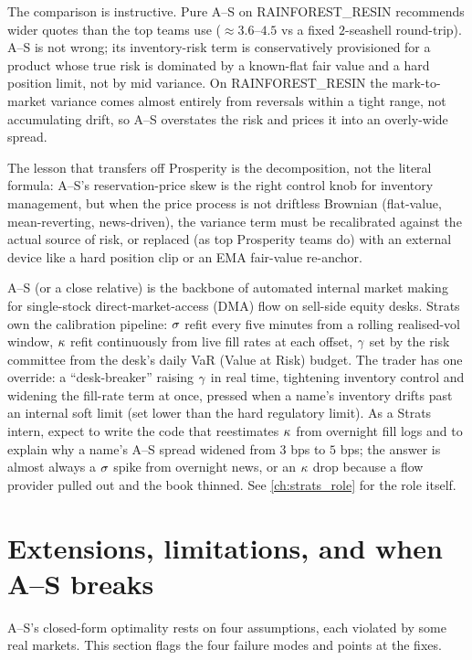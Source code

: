 The comparison is instructive. Pure A--S on RAINFOREST\_RESIN
recommends wider quotes than the top teams use
($\approx 3.6$--$4.5$ vs a fixed $2$-seashell round-trip). A--S is
not wrong; its inventory-risk term is conservatively provisioned for
a product whose true risk is dominated by a known-flat fair value
and a hard position limit, not by mid variance. On RAINFOREST\_RESIN
the mark-to-market variance comes almost entirely from reversals
within a tight range, not accumulating drift, so A--S overstates
the risk and prices it into an overly-wide spread.

The lesson that transfers off Prosperity is the decomposition, not
the literal formula: A--S's reservation-price skew is the right
control knob for inventory management, but when the price process
is not driftless Brownian (flat-value, mean-reverting, news-driven),
the variance term must be recalibrated against the actual source of
risk, or replaced (as top Prosperity teams do) with an external
device like a hard position clip or an EMA fair-value re-anchor.

\begin{gsbox}
A--S (or a close relative) is the backbone of automated internal
market making for single-stock direct-market-access (DMA) flow on
sell-side equity desks. Strats own the calibration pipeline:
$\sigma$ refit every five minutes from a rolling realised-vol
window, $\kappa$ refit continuously from live fill rates at each
offset, $\gamma$ set by the risk committee from the desk's daily
VaR (Value at Risk) budget. The trader has one override: a
``desk-breaker'' raising $\gamma$ in real time, tightening
inventory control and widening the fill-rate term at once, pressed
when a name's inventory drifts past an internal soft limit (set
lower than the hard regulatory limit). As a Strats intern, expect
to write the code that reestimates $\kappa$ from overnight fill
logs and to explain why a name's A--S spread widened from $3$ bps
to $5$ bps; the answer is almost always a $\sigma$ spike from
overnight news, or an $\kappa$ drop because a flow provider pulled
out and the book thinned. See \cref{ch:strats_role} for the role
itself.
\end{gsbox}

\section{Extensions, limitations, and when A--S breaks}
\label{sec:ch8_breaks}

A--S's closed-form optimality rests on four assumptions, each
violated by some real markets. This section flags the four failure
modes and points at the fixes.


